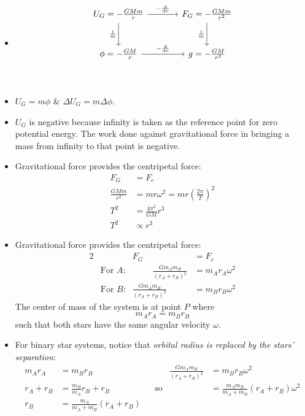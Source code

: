 \documentclass[oneside]{book}
\begin{document}
\begin{itemize}[label=\(\square\)]
    \item \[
\begin{tikzcd}[row sep=large, column sep=large]
     U_G=-\frac{GMm}{r} \arrow{r}{-\frac{\text{d}}{\text{d}r}} \arrow[swap]{d}{\frac{1}{m}} & F_G=-\frac{GMm}{r^2} \arrow[swap]{d}{\frac{1}{m}} \\
     \phi=-\frac{GM}{r} \arrow{r}{-\frac{\text{d}}{\text{d}r}} & g=-\frac{GM}{r^2}\\
\end{tikzcd}
\]
\item \(U_G=m\phi\) \& \(\Delta U_G=m\Delta\phi\).
\item \(U_G\) is negative because infinity is taken as the reference point for zero potential energy. The work done against gravitational force in bringing a mass from infinity to that point is negative.
\item Gravitational force provides the centripetal force:
\begin{align*}
    F_G&=F_c\\
    \frac{GMm}{r^2}&=mr\omega^2=mr\left(\frac{2\pi}{T}\right)^2\\
    T^2&=\frac{4\pi^2}{GM}r^3\\
    T^2 &\propto r^3
\end{align*}
\item Gravitational force provides the centripetal force:
\begin{alignat*}{2}
    && F_G&=F_c\\
    &\text{For \(A\):}& \hspace{1cm} \frac{Gm_Am_B}{(r_A+r_B)^2}&=m_Ar_A\omega^2\\
    &\text{For \(B\):}& \frac{Gm_Am_B}{(r_A+r_B)^2}&=m_Br_B\omega^2
\end{alignat*}
The center of mass of the system is at point \(P\) where 
\[m_Ar_A=m_Br_B\]
such that both stars have the same angular velocity \(\omega\).
\item For binary star systems, notice that \emph{orbital radius is replaced by the stars' separation}:
\begin{align*}
    m_Ar_A&=m_Br_B& && \frac{Gm_Am_B}{(r_A+r_B)^2}&=m_Br_B\omega^2\\
    r_A+r_B&=\frac{m_B}{m_A}r_B+r_B& &\text{so}& &=\frac{m_Am_B}{m_A+m_B}(r_A+r_B)\omega^2\\
    r_B&=\frac{m_A}{m_A+m_B}(r_A+r_B)& && &\\
\end{align*}

\end{itemize}
\end{document}
